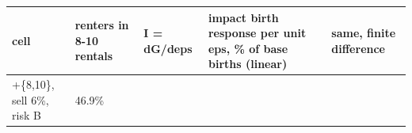\begingroup\small
\setlength{\tabcolsep}{3pt}
\renewcommand{\arraystretch}{1.04}
\begin{tabularx}{\linewidth}{XXXXX}
\toprule
cell & renters in 8-10 rentals & I = dG/deps & impact birth response per unit eps, \% of base births (linear) & same, finite difference \\
\midrule
[0,6]+\{8,10\}, sell 6\%, risk B & 46.9\% &  &  &  \\
\bottomrule
\end{tabularx}
\endgroup
